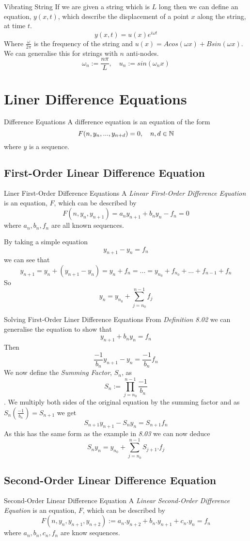 \documentclass[11pt,a4paper]{article}
\begin{document}
\subtitle{Theorem 7.02 - }{Vibrating String}
If we are given a string which is $L$ long then we can define an equation, $y(x,t)$, which describe the displacement of a point $x$ along the string, at time $t$. $$y(x,t) = u(x)e^{i\omega t}$$
Where $\frac{\omega}{2\pi}$ is the frequency of the string and $u(x) = Acos(\omega x) + Bsin(\omega x)$. \\
We can generalise this for strings with $n$ anti-nodes. $$\omega_n := \frac{n\pi}{L},\quad u_n := sin(\omega_nx)$$

\section{Liner Difference Equations}

\subtitle{Definition 8.01 - }{Difference Equations}
A difference equation is an equation of the form $$F(n, y_n, ... , y_{n+d}) = 0,\quad n,d \in \mathbb{N}$$
where $y$ is a sequence.\\

\subsection{First-Order Linear Difference Equation}
\subtitle{Definition 8.02 - }{Liner First-Order Difference Equations}
A \textit{Linear First-Order Difference Equation} is an equation, $F$, which can be described by $$F(n, y_n, y_{n+1}) = a_ny_{n+1} + b_ny_n - f_n = 0$$
where $a_n, b_n, f_n$ are all known sequences. \\

\subtitle{Example 8.03}{}
By taking a simple equation $$y_{n+1} - y_n = f_n$$
we can see that $$y_{n+1} = y_n +(y_{n+1} - y_n) = y_n + f_n = ... = y_{n_0} +f_{n_0} + ... + f_{n-1} + f_n$$
So $$y_n = y_{n_0} + \sum_{j = n_0}^{n-1} f_j$$

\subtitle{Theorem 8.04 - }{Solving First-Order Liner Difference Equations}
From \textit{Definition 8.02} we can generalise the equation to show that $$y_{n+1} + b_ny_n = f_n$$
Then $$\frac{-1}{b_n}y_{n+1}-y_n = \frac{-1}{b_n}f_n$$
We now define the \textit{Summing Factor}, $S_n$, as $$S_n :=\prod_{j={n_0}}^{n-1}\frac{-1}{b_n}$$.
We multiply both sides of the original equation by the summing factor and as $S_n(\frac{-1}{b_n})=S_{n+1}$ we get $$S_{n+1}y_{n+1} - S_ny_n = S_{n+1}f_n$$
As this has the same form as the example in \textit{8.03} we can now deduce $$S_ny_n = y_{n_0} + \sum_{j={n_0}}^{n-1}S_{j+1}.f_j$$

\subsection{Second-Order Linear Difference Equation}
%
\subtitle{Definition 8.05 - }{Second-Order Linear Difference Equation}
A \textit{Linear Second-Order Difference Equation} is an equation, $F$, which can be described by
$$F(n, y_n, y_{n+1}, y_{n+2}) := a_n.y_{n+2} + b_n.y_{n+1} +c_n.y_n = f_n$$
where $a_n, b_n, c_n, f_n$ are know sequences. \\
\end{document}

